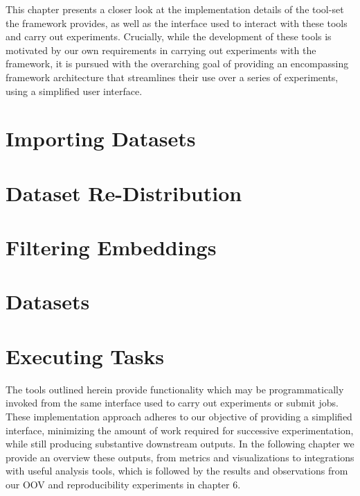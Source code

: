 \documentclass[../../fyp.tex]{subfiles}
\begin{document}
 \label{chap:implementation}
This chapter presents a closer look at the implementation details of the tool-set the framework provides, as well as the interface used to interact with these tools and carry out experiments. Crucially, while the development of these tools is motivated by our own requirements in carrying out experiments with the framework, it is pursued with the overarching goal of providing an encompassing framework architecture that streamlines their use over a series of experiments, using a simplified user interface. 

\section{Importing Datasets} \label{sec:importing_datasets}


\section{Dataset Re-Distribution} \label{sec:dataset_redist}


\section{Filtering Embeddings} \label{sec:filtering_embeddings}


\section{Datasets}


\section{Executing Tasks} \label{sec:executing_tasks}


The tools outlined herein provide functionality which may be programmatically invoked from the same interface used to carry out experiments or submit jobs. These implementation approach adheres to our objective of providing a simplified interface, minimizing the amount of work required for successive experimentation, while still producing substantive downstream outputs. In the following chapter we provide an overview these outputs, from metrics and visualizations to integrations with useful analysis tools, which is followed by the results and observations from our OOV and reproducibility experiments in chapter 6.
\end{document}
